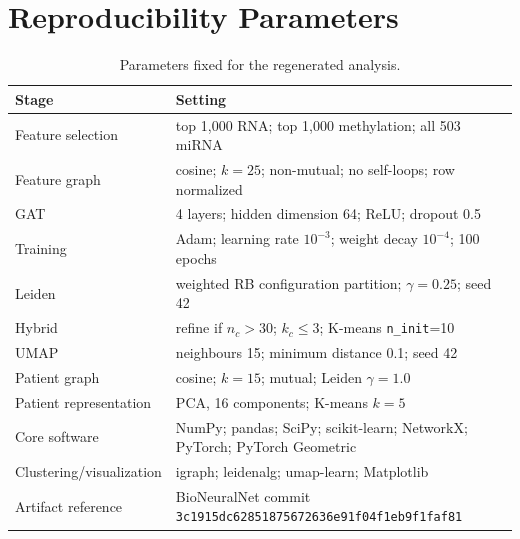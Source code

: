 \documentclass[11pt]{article}
\begin{document}
\section{Reproducibility Parameters}

\begin{table}[H]
\centering
\caption{Parameters fixed for the regenerated analysis.}
\small
\begin{tabular}{p{}p{}}
\toprule
Stage & Setting \\
\midrule
Feature selection & top 1,000 RNA; top 1,000 methylation; all 503 miRNA \\
Feature graph & cosine; $k=25$; non-mutual; no self-loops; row normalized \\
GAT & 4 layers; hidden dimension 64; ReLU; dropout 0.5 \\
Training & Adam; learning rate $10^{-3}$; weight decay $10^{-4}$; 100 epochs \\
Leiden & weighted RB configuration partition; $\gamma=0.25$; seed 42 \\
Hybrid & refine if $n_c>30$; $k_c\leq3$; K-means \texttt{n\_init}=10 \\
UMAP & neighbours 15; minimum distance 0.1; seed 42 \\
Patient graph & cosine; $k=15$; mutual; Leiden $\gamma=1.0$ \\
Patient representation & PCA, 16 components; K-means $k=5$ \\
Core software & NumPy; pandas; SciPy; scikit-learn; NetworkX; PyTorch; PyTorch Geometric \\
Clustering/visualization & igraph; leidenalg; umap-learn; Matplotlib \\
Artifact reference & BioNeuralNet commit \texttt{3c1915dc62851875672636e91f04f1eb9f1faf81} \\
\bottomrule
\end{tabular}
\end{table}
\end{document}
